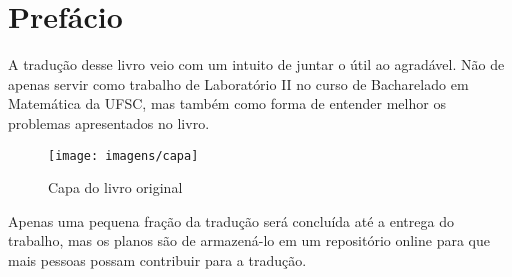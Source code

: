 \chapter{Prefácio}

A tradução desse livro veio com um intuito de juntar o útil ao agradável. Não de apenas servir como trabalho de Laboratório II no curso de Bacharelado em Matemática da UFSC, mas também como forma de entender melhor os problemas apresentados no livro.

\begin{figure}[h!]
	\centering
	\texttt{[image: imagens/capa]}
	\caption{Capa do livro original}
	\label{figRotulo}
\end{figure}


Apenas uma pequena fração da tradução será concluída até a entrega do trabalho, mas os planos são de armazená-lo em um repositório online para que mais pessoas possam contribuir para a tradução.
